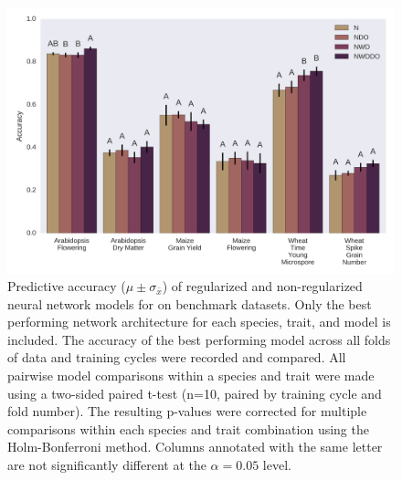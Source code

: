 
\begin{figure}[htbp]
\renewcommand{\familydefault}{\sfdefault}\normalfont
\centering 
\includegraphics[keepaspectratio,height=\textheight,width=\linewidth]{g3_article/figures/network_comparison.png}
    \caption{Predictive accuracy ($\mu \pm \sigma_{\bar{x}}$) of 
             regularized and non-regularized 
             neural network models for on benchmark datasets. Only the best performing
             network architecture for each species, trait, and model is included. 
             The accuracy of the best performing model across all folds of data 
             and training cycles were recorded and compared. All pairwise model 
             comparisons within a species and trait were made using a two-sided paired t-test 
             (n=10, paired by training cycle and fold number).
             The resulting p-values were corrected for multiple comparisons within each 
             species and trait combination using the Holm-Bonferroni method. Columns annotated 
             with the same letter are not significantly different 
             at the $\alpha=0.05$ level.}
\label{fig:network-comparison}
\end{figure}
